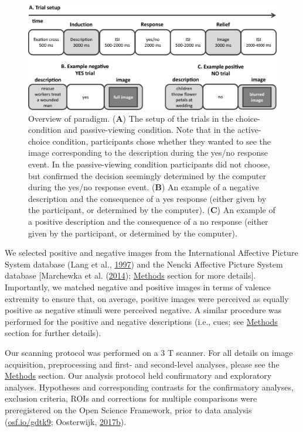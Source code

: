 \documentclass[11pt,american,a4paper,oneside,]{memoir} %
\begin{document}
\begin{figure}
\centering
\includegraphics{_bookdown_files/morbid-curiosity-files/figures/figure_1.pdf}
\caption{\label{fig:fig-morbid-curiosity-1}Overview of paradigm. (\textbf{A}) The setup of the trials in the choice-condition and passive-viewing condition. Note that in the active-choice condition, participants chose whether they wanted to see the image corresponding to the description during the yes/no response event. In the passive-viewing condition participants did not choose, but confirmed the decision seemingly determined by the computer during the yes/no response event. (\textbf{B}) An example of a negative description and the consequence of a yes response (either given by the participant, or determined by the computer). (\textbf{C}) An example of a positive description and the consequence of a no response (either given by the participant, or determined by the computer).}
\end{figure}



We selected positive and negative images from the International Affective Picture System database (Lang et al., \protect\hyperlink{ref-lang1997international}{1997}) and the Nencki Affective Picture System database {[}Marchewka et al. (\protect\hyperlink{ref-marchewka2014nencki}{2014}); \protect\hyperlink{morbid-curiosity-methods}{Methods} section for more details{]}. Importantly, we matched negative and positive images in terms of valence extremity to ensure that, on average, positive images were perceived as equally positive as negative stimuli were perceived negative. A similar procedure was performed for the positive and negative descriptions (i.e., cues; see \protect\hyperlink{morbid-curiosity-methods}{Methods} section for further details).

Our scanning protocol was performed on a 3 T scanner. For all details on image acquisition, preprocessing and first- and second-level analyses, please see the \protect\hyperlink{morbid-curiosity-methods}{Methods} section. Our analysis protocol held confirmatory and exploratory analyses. Hypotheses and corresponding contrasts for the confirmatory analyses, exclusion criteria, ROIs and corrections for multiple comparisons were preregistered on the Open Science Framework, prior to data analysis (\url{osf.io/gdtk9}; Oosterwijk, \protect\hyperlink{ref-oosterwijk2017prereg}{2017}\protect\hyperlink{ref-oosterwijk2017prereg}{b}).
\end{document}
